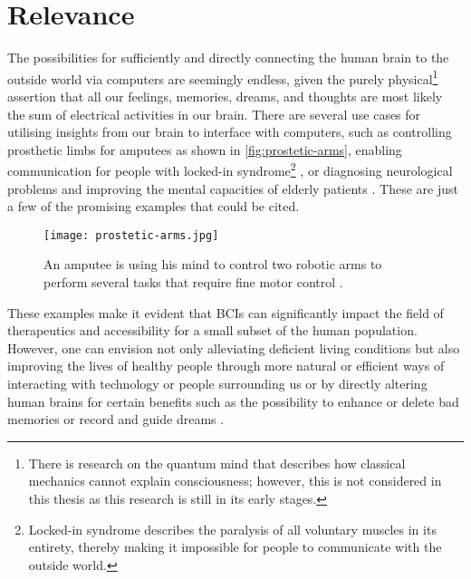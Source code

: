 \section{Relevance}
\label{chapter1-relevance}

The possibilities for sufficiently and directly connecting the human brain to the outside world via computers are seemingly endless, given the purely physical\footnote{There is research on the quantum mind that describes how classical mechanics cannot explain consciousness; however, this is not considered  in this thesis as this research is still in its early stages.} assertion that all our feelings, memories, dreams, and thoughts are most likely the sum of electrical activities in our brain. There are several use cases for utilising insights from our brain to interface with computers, such as controlling prosthetic limbs for amputees \citep{campbell_amputee_2014} as shown in \autoref{fig:prostetic-arms}, enabling communication for people with locked-in syndrome\footnote{Locked-in syndrome describes the paralysis of all voluntary muscles in its entirety, thereby making it impossible for people to communicate with the outside world.} \citep{chaudhary_spelling_2022}, or diagnosing neurological problems and improving the mental capacities of elderly patients \citep{belkacem_brain_2020}. These are just a few of the promising examples that could be cited.

\begin{figure}[ht]
  \centering
  \texttt{[image: prostetic-arms.jpg]}
  \caption[An amputee is using his mind to control two robotic arms to perform several tasks that require fine motor control]{An amputee is using his mind to control two robotic arms to perform several tasks that require fine motor control \citep{campbell_amputee_2014}.}
  \label{fig:prostetic-arms}
\end{figure}

These examples make it evident that BCIs can significantly impact the field of therapeutics and accessibility for a small subset of the human population. However, one can envision not only alleviating deficient living conditions but also improving the lives of healthy people through more natural or efficient ways of interacting with technology or people surrounding us or by directly altering human brains for certain benefits such as the possibility to enhance or delete bad memories \citep{spiers_enhance_2014} or record and guide dreams \citep{haar_horowitz_dormio_2020}.

